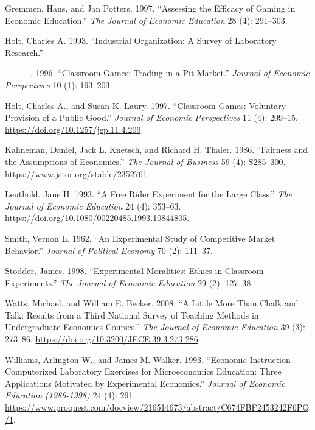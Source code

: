 \documentclass[
]{article}
\newlength{\cslhangindent}
\newlength{\cslentryspacingunit} %
\newenvironment{CSLReferences}[2] %
 {%
  \setlength{\parindent}{0pt}
  \ifodd #1
  \let\oldpar\par
  \def\par{\hangindent=\cslhangindent\oldpar}
  \fi
  \setlength{\parskip}{#2\cslentryspacingunit}
 }%
 {}
\begin{document}
\begin{CSLReferences}{1}{0}
\leavevmode{}%
Gremmen, Hans, and Jan Potters. 1997. {``Assessing the Efficacy of
Gaming in Economic Education.''} \emph{The Journal of Economic
Education} 28 (4): 291--303.

\leavevmode{}%
Holt, Charles A. 1993. {``Industrial {Organization}: {A} {Survey} of
{Laboratory} {Research}.''}

\leavevmode{}%
---------. 1996. {``Classroom Games: {Trading} in a Pit Market.''}
\emph{Journal of Economic Perspectives} 10 (1): 193--203.

\leavevmode{}%
Holt, Charles A., and Susan K. Laury. 1997. {``Classroom Games:
Voluntary Provision of a Public Good.''} \emph{Journal of Economic
Perspectives} 11 (4): 209--15.
\url{https://doi.org/10.1257/jep.11.4.209}.

\leavevmode{}%
Kahneman, Daniel, Jack L. Knetsch, and Richard H. Thaler. 1986.
{``Fairness and the Assumptions of Economics.''} \emph{The Journal of
Business} 59 (4): S285--300. \url{https://www.jstor.org/stable/2352761}.

\leavevmode{}%
Leuthold, Jane H. 1993. {``A Free Rider Experiment for the Large
Class.''} \emph{The Journal of Economic Education} 24 (4): 353--63.
\url{https://doi.org/10.1080/00220485.1993.10844805}.

\leavevmode{}%
Smith, Vernon L. 1962. {``An Experimental Study of Competitive Market
Behavior.''} \emph{Journal of Political Economy} 70 (2): 111--37.

\leavevmode{}%
Stodder, James. 1998. {``Experimental Moralities: {Ethics} in Classroom
Experiments.''} \emph{The Journal of Economic Education} 29 (2):
127--38.

\leavevmode{}%
Watts, Michael, and William E. Becker. 2008. {``A {Little} {More} Than
{Chalk} and {Talk}: {Results} from a {Third} {National} {Survey} of
{Teaching} {Methods} in {Undergraduate} {Economics} {Courses}.''}
\emph{The Journal of Economic Education} 39 (3): 273--86.
\url{https://doi.org/10.3200/JECE.39.3.273-286}.

\leavevmode{}%
Williams, Arlington W., and James M. Walker. 1993. {``Economic
{Instruction} {Computerized} {Laboratory} {Exercises} for
{Microeconomics} {Education}: {Three} {Applications} {Motivated} by
{Experimental} {Economics}.''} \emph{Journal of Economic Education
(1986-1998)} 24 (4): 291.
\url{https://www.proquest.com/docview/216514673/abstract/C674FBF2453242F6PQ/1}.

\end{CSLReferences}
\end{document}
